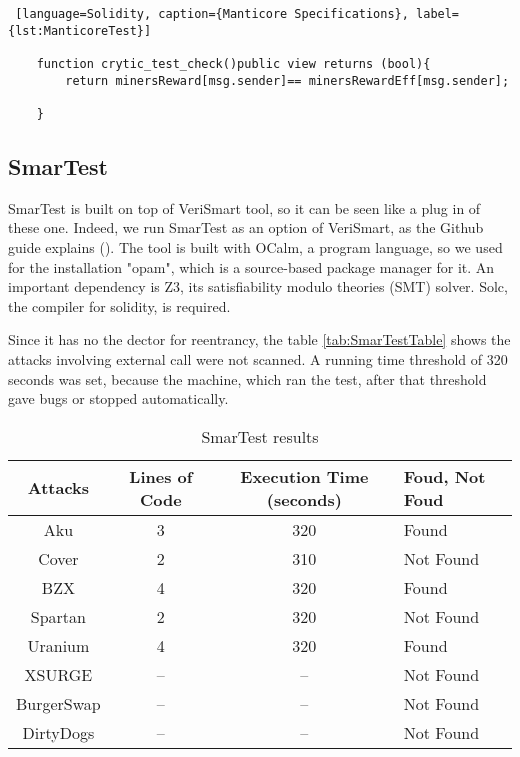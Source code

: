 \begin{lstlisting} [language=Solidity, caption={Manticore Specifications}, label={lst:ManticoreTest}]
    
    function crytic_test_check()public view returns (bool){
        return minersReward[msg.sender]== minersRewardEff[msg.sender];

    }
\end{lstlisting} 

\subsection*{SmarTest} SmarTest is built on top of VeriSmart tool, so it can be seen like a plug in of these one. Indeed, we run SmarTest as an option of VeriSmart, 
as the Github guide explains (\cite{SmarTestGitHub}). The tool is built with OCalm, a program language, so we used for the installation "opam", which is a source-based package manager for it.
An important dependency is Z3, its satisfiability modulo theories (SMT) solver. Solc, the compiler for solidity, is required.

Since it has no the dector for reentrancy, the table \autoref{tab:SmarTestTable} shows the attacks involving external call were not scanned. 
A running time threshold of 320 seconds was set, because the machine, which ran the test, after that threshold gave bugs or stopped automatically.

\begin{center}
    \begin{table*}
        \caption{SmarTest results}
            \label{tab:SmarTestTable}
            \begin{tabular}{cccl}
            \toprule
                Attacks & Lines of Code & Execution Time (seconds) & Foud, Not Foud\\
                \midrule
                Aku & 3 & 320 & Found \\ 
                Cover & 2 & 310& Not Found\\ 
                BZX  & 4 & 320 & Found\\ 
                Spartan & 2 & 320& Not Found\\ 
                Uranium  & 4 & 320 & Found \\ 
                XSURGE &  -- & -- & Not Found \\  
                BurgerSwap &  -- & -- & Not Found\\ 
                DirtyDogs &  -- & -- & Not Found \\
            \bottomrule
            \end{tabular}
        \end{table*}
\end{center}

